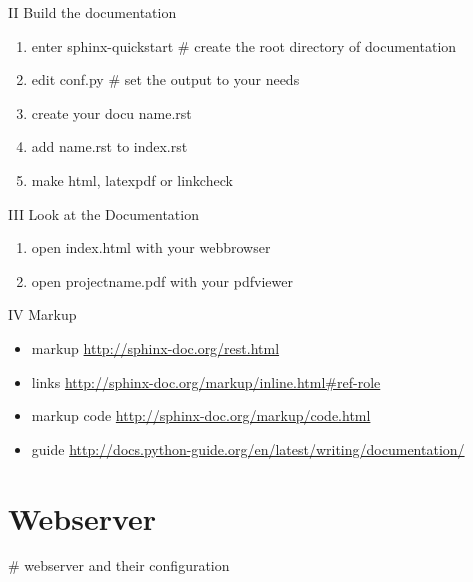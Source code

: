 \documentclass[letterpaper,10pt,english]{sphinxmanual}
\begin{document}
II Build the documentation
\begin{enumerate}
\item {} 
enter sphinx-quickstart \# create the root directory of documentation

\item {} 
edit conf.py \# set the output to your needs

\item {} 
create your docu name.rst

\item {} 
add name.rst to index.rst

\item {} 
make html, latexpdf or linkcheck

\end{enumerate}

III Look at the Documentation
\begin{enumerate}
\item {} 
open index.html with your webbrowser

\item {} 
open projectname.pdf with your pdfviewer

\end{enumerate}

IV Markup
\begin{itemize}
\item {} 
markup \href{http://sphinx-doc.org/rest.html}{http://sphinx-doc.org/rest.html}

\item {} 
links \href{http://sphinx-doc.org/markup/inline.html\#ref-role}{http://sphinx-doc.org/markup/inline.html\#ref-role}

\item {} 
markup code \href{http://sphinx-doc.org/markup/code.html}{http://sphinx-doc.org/markup/code.html}

\item {} 
guide \href{http://docs.python-guide.org/en/latest/writing/documentation/}{http://docs.python-guide.org/en/latest/writing/documentation/}

\end{itemize}


\section{Webserver}
\label{sdocs/webserver/webserver:webserver}\label{sdocs/webserver/webserver::doc}
\# webserver and their configuration
\end{document}
